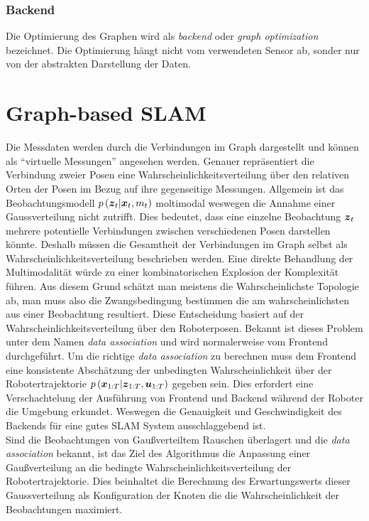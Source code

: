 \documentclass[12pt]{article}
\renewcommand*\vec[1]{{\mbox{\boldmath\ensuremath{#1}}}}
\begin{document}
\subsubsection{Backend}
Die Optimierung des Graphen wird als \textit{backend} oder \textit{graph optimization} bezeichnet. Die Optimierung hängt nicht vom verwendeten Sensor
ab, sonder nur von der abstrakten Darstellung der Daten.

\section{Graph-based SLAM}
Die Messdaten werden durch die Verbindungen im Graph dargestellt und können als ``virtuelle Messungen'' angesehen werden. Genauer repräsentiert die
Verbindung zweier Posen eine Wahrscheinlichkeitsverteilung über den relativen Orten der Posen im Bezug auf ihre gegenseitige Messungen. Allgemein ist
das Beobachtungsmodell $p\left(\vec z_t|\vec x_t, m_t\right)$ moltimodal weswegen die Annahme einer Gaussverteilung nicht zutrifft. Dies bedeutet, 
dass eine einzelne Beobachtung $\vec z_t$ mehrere potentielle Verbindungen zwischen verschiedenen Posen darstellen könnte. Deshalb müssen die Gesamtheit 
der Verbindungen im Graph selbst als Wahrscheinlichkeitsverteilung beschrieben werden. Eine direkte Behandlung der Multimodalität würde zu einer 
kombinatorischen Explosion der Komplexität führen. Aus diesem Grund schätzt man meistens die Wahrscheinlichste Topologie ab, man muss also die 
Zwangsbedingung bestimmen die am wahrscheinlichsten aus einer Beobachtung resultiert. Diese Entscheidung basiert auf der Wahrscheinlichkeitsverteilung über
den Roboterposen. Bekannt ist dieses Problem unter dem Namen \textit{data association} und wird normalerweise vom Frontend durchgeführt. Um die richtige
\textit{data association} zu berechnen muss dem Frontend eine konsistente Abschätzung der unbedingten Wahrscheinlichkeit über der Robotertrajektorie
$p\left(\vec x_{1:T}|\vec z_{1:T}, \vec u_{1:T}\right)$ gegeben sein. Dies erfordert eine Verschachtelung der Ausführung von Frontend und Backend während
der Roboter die Umgebung erkundet. Weswegen die Genauigkeit und Geschwindigkeit des Backends für eine gutes SLAM System ausschlaggebend ist.
\\

Sind die Beobachtungen von Gaußverteiltem Rauschen überlagert und die \textit{data association} bekannt, ist das Ziel des Algorithmus die Anpassung einer
Gaußverteilung an die bedingte Wahrscheinlichkeitsverteilung der Robotertrajektorie. Dies beinhaltet die Berechnung des Erwartungswerts dieser 
Gaussverteilung als Konfiguration der Knoten die die Wahrscheinlichkeit der Beobachtungen maximiert.
\end{document}
